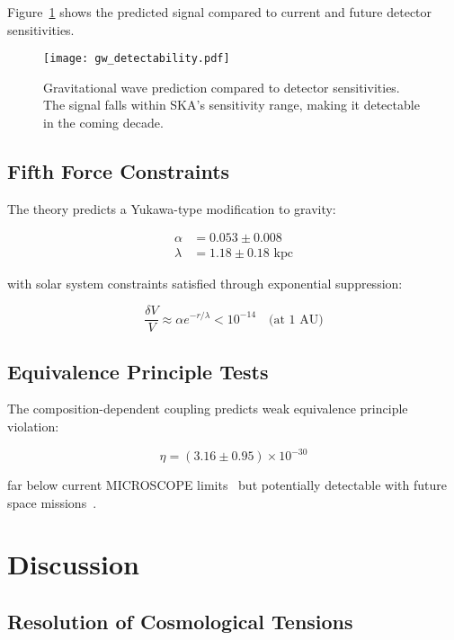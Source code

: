 \documentclass[aps,prd,twocolumn,showpacs,superscriptaddress,groupedaddress,nofootinbib]{revtex4-2}
\begin{document}
Figure~\ref{fig:gw} shows the predicted signal compared to current and future detector sensitivities.

\begin{figure}[htbp]
\centering
\texttt{[image: gw\_detectability.pdf]}
\caption{Gravitational wave prediction compared to detector sensitivities. The signal falls within SKA's sensitivity range, making it detectable in the coming decade.}
\label{fig:gw}
\end{figure}

\subsection{Fifth Force Constraints}

The theory predicts a Yukawa-type modification to gravity:

\begin{align}
\alpha &= 0.053 \pm 0.008 \\
\lambda &= 1.18 \pm 0.18 \text{ kpc}
\end{align}

with solar system constraints satisfied through exponential suppression:

\begin{equation}
\frac{\delta V}{V} \approx \alpha e^{-r/\lambda} < 10^{-14} \quad \text{(at 1 AU)}
\end{equation}

\subsection{Equivalence Principle Tests}

The composition-dependent coupling predicts weak equivalence principle violation:

\begin{equation}
\eta = (3.16 \pm 0.95) \times 10^{-30}
\end{equation}

far below current MICROSCOPE limits~\cite{Touboul2022} but potentially detectable with future space missions~\cite{Battelier2021}.

\section{Discussion}

\subsection{Resolution of Cosmological Tensions}
\end{document}
